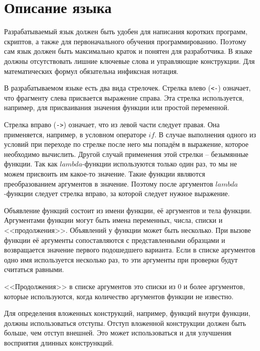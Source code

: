 \section{Описание языка}
    Разрабатываемый язык должен быть удобен для написания коротких программ, скриптов, а также для первоначального обучения программированию.
    Поэтому сам язык должен быть максимально краток и понятен для разработчика.
    В языке должны отсутствовать лишние ключевые слова и управляющие конструкции.
    Для математических формул обязательна инфиксная нотация.

    В разрабатываемом языке есть два вида стрелочек.
    Стрелка влево (\verb!<-!) означает, что фрагменту слева присвается выражение справа.
    Эта стрелка используется, например, для присваивания значения функции или простой переменной.

    Стрелка вправо (\verb!->!) означает, что из левой части следует правая.
    Она применяется, например, в условном операторе $if$.
    В случае выполнения одного из условий при переходе по стрелке после него мы попадём в выражение, которое необходимо вычислить.
    Другой случай применения этой стрелки -- безымянные функции.
    Так как $lambda$-функции используются только один раз, то мы не можем присвоить им какое-то значение.
    Такие функции являются преобразованием аргументов в значение.
    Поэтому после аргументов $lambda$-функции следует стрелка вправо, за которой следует нужное выражение.

    Объявление функций состоит из имени функции, её аргументов и тела функции.
    Аргументами функции могут быть имена переменных, числа, списки и <<продолжения>>.
    Объявлений у функции может быть несколько.
    При вызове функции её аргументы сопоставляются с представленными образцами и возвращается значение первого подошедшего варианта.
    Если в списке аргументов одно имя используется несколько раз, то эти аргументы при проверки будут считаться равными.

    <<Продолжения>> в списке аргументов это списки из 0 и более аргументов, которые используются, когда количество аргументов функции не известно.

    Для определения вложенных конструкций, например, функций внутри функции, должны использоваться отступы.
    Отступ вложенной конструкции должен быть больше, чем отступ внешней.
    Это может использоваться и для улучшения восприятия длинных констрункций.

